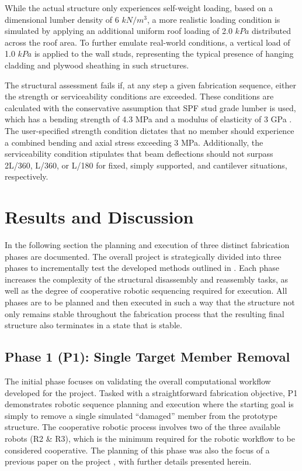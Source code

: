         While the actual structure only experiences self-weight loading, based on a dimensional lumber density of 6 $kN/m^3$, a more realistic loading condition is simulated by applying an additional uniform roof loading of 2.0 $kPa$ distributed across the roof area. To further emulate real-world conditions, a vertical load of 1.0 $kPa$ is applied to the wall studs, representing the typical presence of hanging cladding and plywood sheathing in such structures.

        The structural assessment fails if, at any step a given fabrication sequence, either the strength or serviceability conditions are exceeded. These conditions are calculated with the conservative assumption that SPF stud grade lumber is used, which has a bending strength of 4.3 MPa and a modulus of elasticity of 3 GPa \citep{american_wood_council_national_2015}. The user-specified strength condition dictates that no member should experience a combined bending and axial stress exceeding 3 MPa. Additionally, the serviceability condition stipulates that beam deflections should not surpass 2L/360, L/360, or L/180 for fixed, simply supported, and cantilever situations, respectively.

\section{Results and Discussion} \label{sec:5_results}
    In the following section the planning and execution of three distinct fabrication phases are documented. The overall project is strategically divided into three phases to incrementally test the developed methods outlined in . Each phase increases the complexity of the structural disassembly and reassembly tasks, as well as the degree of cooperative robotic sequencing required for execution. All phases are to be planned and then executed in such a way that the structure not only remains stable throughout the fabrication process that the resulting final structure also terminates in a state that is stable.

\subsection{Phase 1 (P1): Single Target Member Removal}
    The initial phase focuses on validating the overall computational workflow developed for the project. Tasked with a straightforward fabrication objective, P1 demonstrates robotic sequence planning and execution where the starting goal is simply to remove a single simulated ``damaged'' member from the prototype structure. The cooperative robotic process involves two of the three available robots (R2 \& R3), which is the minimum required for the robotic workflow to be considered cooperative. The planning of this phase was also the focus of a previous paper on the project \citep{bruun_zerowaste_2022}, with further details presented herein.

